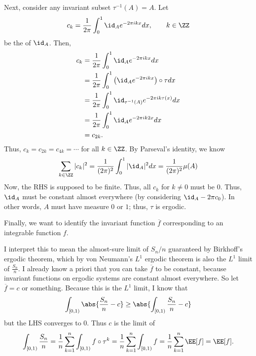 \documentclass[11pt, headheight=30pt]{scrartcl}
\begin{document}
Next, consider any invariant subset $\tau^{-1}(A) = A$. Let
\[
    c_k = \frac{1}{2\pi}\int_0^1 \id_A e^{-2\pi i k x} dx,\qquad k\in \ZZ
\]
be the  of $\id_A$.
Then,
\begin{align*}
    c_k &= \frac{1}{2\pi}\int_0^1 \id_A e^{-2\pi i k x} dx\\
    &= \frac{1}{2\pi}\int_0^1 \left(\id_A e^{-2\pi i k x}\right)\circ \tau dx \\
    &= \frac{1}{2\pi}\int_0^1 \id_{\tau^{-1}(A)} e^{-2\pi i k \tau(x)} dx \\
    &= \frac{1}{2\pi}\int_0^1 \id_{A} e^{-2\pi i k 2x} dx \\
    &= c_{2k}.
\end{align*}
Thus, $c_k = c_{2k} = c_{4k} = \cdots$ for all $k \in \ZZ$.
By Parseval's identity, we know
\[
    \sum_{k\in \ZZ} |c_k|^2 = \frac{1}{(2\pi)^2}\int_0^1 |\id_A|^2 dx = \frac{1}{(2\pi)^2}\mu(A)
\]
Now, the RHS is supposed to be finite. Thus, all $c_k$ for $k\neq 0$
must be $0$. Thus, $\id_A$ must be constant almost everywhere (by considering $\id_A - 2\pi c_0$).
In other words, $A$ must have measure $0$ or $1$; thus, $\tau$ is ergodic.

Finally, we want to identify the invariant function
$\overline{f}$ corresponding to an integrable function $f$.

I interpret this to mean the almost-sure limit of $S_n / n$
guaranteed by Birkhoff's ergodic theorem, which by von
Neumann's $L^1$ ergodic theorem is also the $L^1$ limit
of $\frac{S_n}{n}$. I already know a priori that you can
take $\overline{f}$ to be constant, because invariant
functions on ergodic systems are constant almost everywhere.
So let $\overline{f} = c$ or something. Because this is the $L^1$
limit, I know that
\[
    \int_{[0,1)} \abs{\frac{S_n}{n} - c} \geq \abs{\int_{[0,1)} \frac{S_n}{n} - c} 
\]
but the LHS converges to $0$. Thus $c$ is the limit of
\[
    \int_{[0,1)} \frac{S_n}{n} = \frac{1}{n}\sum_{k=1}^n \int_{[0,1)} f\circ \tau^k = \frac{1}{n}\sum_{k=1}^n \int_{[0,1)} f = \frac{1}{n}\sum_{k=1}^n \EE[f] = \EE[f].    
\]
\end{document}
